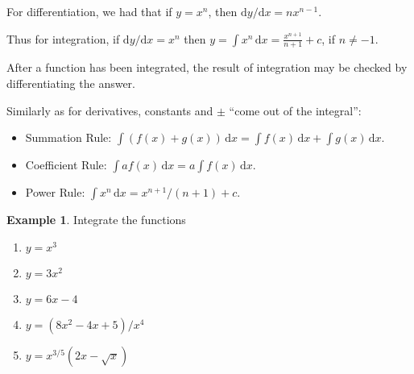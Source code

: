 \documentclass[
  english,
  11pt,
  oneside]{book}
\providecommand{\tightlist}{%
  \setlength{\itemsep}{0pt}\setlength{\parskip}{0pt}}
\newcommand{\slide}{}
\theoremstyle{definition}
\theoremstyle{definition}
\newtheorem{example}{Example}[chapter]
\theoremstyle{definition}
\theoremstyle{definition}
\theoremstyle{remark}
\begin{document}
For differentiation, we had that if \(y = x^n\), then \(\mathrm{d}y/\mathrm{d} x= nx^{n-1}\).

Thus for integration, if \(\mathrm{d}y/\mathrm{d}x = x^n\) then \(y=\displaystyle\int x^n \,\mathrm{d}x = \frac{x^{n+1}}{n+1} + c\), if \(n \ne -1\).

After a function has been integrated, the result of integration may be checked by differentiating the answer.

\slide

Similarly as for derivatives, constants and \(\pm\) ``come out of the integral'':

\begin{itemize}
\tightlist
\item
  Summation Rule: \(\displaystyle\int(f(x)+g(x))\,\mathrm{d}x = \displaystyle\int f(x)\,\mathrm{d}x + \displaystyle\int g(x)\,\mathrm{d}x\).
\item
  Coefficient Rule: \(\displaystyle\int af(x)\,\mathrm{d}x = a\displaystyle\int f(x)\,\mathrm{d}x\).
\item
  Power Rule: \(\displaystyle\int x^n \,\mathrm{d}x = x^{n+1}/(n+1) + c\).
\end{itemize}

\slide

\begin{example}

Integrate the functions

\begin{enumerate}
\def\labelenumi{\arabic{enumi}.}
\tightlist
\item
  \(y=x^3\)
\item
  \(y=3x^2\)
\item
  \(y=6x-4\)
\item
  \(y=(8x^2-4x+5)/x^4\)
\item
  \(y=x^{3/5}(2x-\sqrt{x})\)
\end{enumerate}

\end{example}
\end{document}
